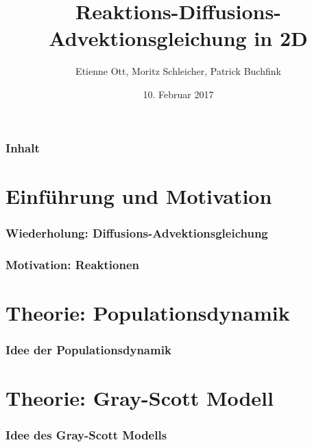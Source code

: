 \documentclass[aspectratio=32]{beamer}
\title{Reaktions-Diffusions-Advektionsgleichung in 2D}
\author{Etienne Ott, Moritz Schleicher, Patrick Buchfink }
\institute{Numerische Simulation}
\date{10. Februar 2017}
\newcommand{\sectionframe}{\begin{frame}
	\begin{center}
		\textcolor{simtechred}{\Large\insertsection}
	\end{center}
\end{frame}}
\begin{document}
\begin{frame}[plain]
\titlepage
\end{frame}

\setcounter{framenumber}{0}

\begin{frame}
\frametitle{Inhalt}
\tableofcontents
\end{frame}

\section{Einführung und Motivation}
\sectionframe

\begin{frame}
\frametitle{Wiederholung: Diffusions-Advektionsgleichung}

\end{frame}

\begin{frame}
\frametitle{Motivation: Reaktionen}

\end{frame}

\section{Theorie: Populationsdynamik}
\sectionframe

\begin{frame}
\frametitle{Idee der Populationsdynamik}

\end{frame}

\section{Theorie: Gray-Scott Modell}
\sectionframe

\begin{frame}
\frametitle{Idee des Gray-Scott Modells}

\end{frame}
\end{document}
